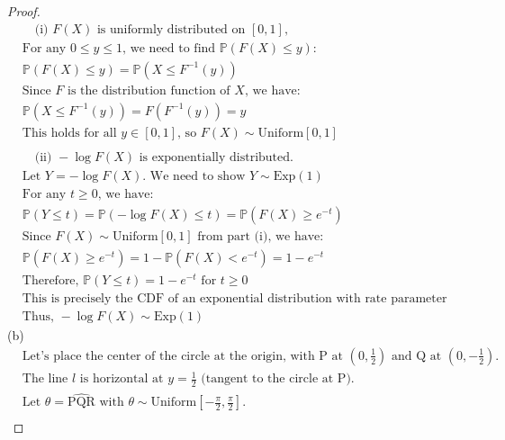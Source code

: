 \documentclass[letterpaper, 11pt]{article}
\newcommand{\1}{\mathds{1}}	%
\theoremstyle{definition}
\begin{document}
    \begin{proof}
        \begin{align*}
            &\quad \text{(i) } F(X) \text{ is uniformly distributed on } [0, 1],\\
            &\text{For any } 0 \leq y \leq 1 \text{, we need to find } \mathbb{P}(F(X) \leq y):\\
            &\mathbb{P}(F(X) \leq y) = \mathbb{P}(X \leq F^{-1}(y))\\
            &\text{Since } F \text{ is the distribution function of } X \text{, we have:}\\
            &\mathbb{P}(X \leq F^{-1}(y)) = F(F^{-1}(y)) = y\\
            &\text{This holds for all } y \in [0,1] \text{, so } F(X) \sim \text{Uniform}[0,1]\\
            &\\
            &\quad \text{(ii) } -\log F(X) \text{ is exponentially distributed.}\\
            &\text{Let } Y = -\log F(X) \text{. We need to show } Y \sim \text{Exp}(1)\\
            &\text{For any } t \geq 0 \text{, we have:}\\
            &\mathbb{P}(Y \leq t) = \mathbb{P}(-\log F(X) \leq t) = \mathbb{P}(F(X) \geq e^{-t})\\
            &\text{Since } F(X) \sim \text{Uniform}[0,1] \text{ from part (i), we have:}\\
            &\mathbb{P}(F(X) \geq e^{-t}) = 1 - \mathbb{P}(F(X) < e^{-t}) = 1 - e^{-t}\\
            &\text{Therefore, } \mathbb{P}(Y \leq t) = 1 - e^{-t} \text{ for } t \geq 0\\
            &\text{This is precisely the CDF of an exponential distribution with rate parameter 1}\\
            &\text{Thus, } -\log F(X) \sim \text{Exp}(1)
            \end{align*}
            (b)
            \begin{align*}
                &\text{Let's place the center of the circle at the origin, with P at $(0, \frac{1}{2})$ and Q at $(0, -\frac{1}{2})$.}\\
                &\text{The line $l$ is horizontal at $y = \frac{1}{2}$ (tangent to the circle at P).}\\
                &\text{Let $\theta = \widehat{\text{PQR}}$ with $\theta \sim \text{Uniform}[-\frac{\pi}{2}, \frac{\pi}{2}]$.}\\

\end{align*}
\end{proof}
\end{document}
